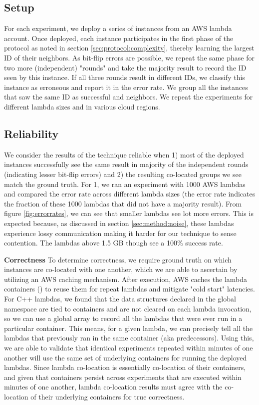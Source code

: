 \subsection{Setup}
\label{subsec:expsetup}
For each experiment, we deploy a series of instances from an AWS lambda
account. Once deployed, each instance participates in the first phase of the
protocol as noted in section \ref{sec:protocol:complexity}, thereby learning the
largest ID of their neighbors. As bit-flip errors are possible, we repeat the
same phase for two more (independent) "rounds" and take the majority result to
record the ID seen by this instance.  If all three rounds result in different
IDs, we classify this instance as erroneous and report it in the error rate. We
group all the instances that saw the same ID as successful and neighbors. We
repeat the experiments for different lambda sizes and in various cloud regions.


\subsection{Reliability}
We consider the results of the technique reliable when 1) most of the deployed
instances successfully see the same result in majority of the independent rounds
(indicating lesser bit-flip errors) and 2) the resulting co-located groups we
see match the ground truth.  For 1, we ran an experiment with 1000 AWS lambdas
and compared the error rate across different lambda sizes (the error rate
indicates the fraction of these 1000 lambdas that did not have a majority
result). From figure \ref{fig:errorrates}, we can see that smaller lambdas see
lot more errors. This is expected because, as discussed in section
\ref{sec:method:noise}, these lambdas experience lossy communication making it
harder for our technique to sense contention. The lambdas above 1.5 GB though
see a 100\% success rate.   

\textbf{Correctness} 
To determine correctness, we require ground truth on which instances are
co-located with one another, which we are able to ascertain by utilizing an AWS
caching mechanism. After execution, AWS caches the lambda containers () to reuse them\cite{awscontainerreuse} for repeat lambdas and mitigate
"cold start" latencies. For C++ lambdas, we found that the data structures
declared in the global namespace are tied to containers and are not cleared on
each lambda invocation, so we can use a global array to record all the lambdas
that were ever run in a particular container. This means, for a given lambda, we
can precisely tell all the lambdas that previously ran in the same container
(aka predecessors).  Using this, we are able to validate that identical
experiments repeated within minutes of one another will use the same set of
underlying containers for running the deployed lambdas. Since lambda co-location
is essentially co-location of their containers, and given that containers
persist across experiments that are executed within minutes of one another,
lambda co-location results must agree with the co-location of their underlying
containers for true correctness.


